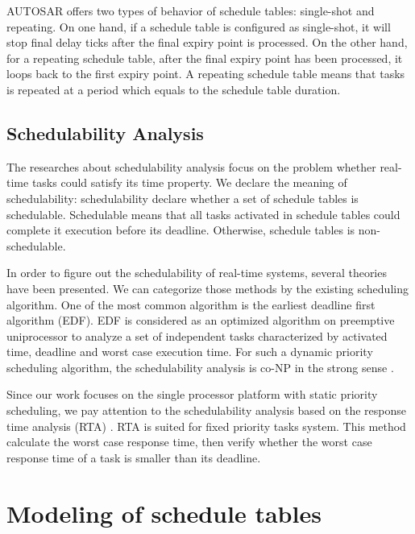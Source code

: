 \documentclass[10pt,conference]{IEEEtran}
\begin{document}
AUTOSAR offers two types of behavior of schedule tables: single-shot and repeating. On one hand, if a schedule table is configured as single-shot, it will stop final delay ticks after the final expiry point is processed. On the other hand, for a repeating schedule table, after the final expiry point has been processed, it loops back to the first expiry point. A repeating schedule table means that tasks is repeated at a period which equals to the schedule table duration.

\subsection{Schedulability Analysis}
The researches about schedulability analysis focus on the problem whether real-time tasks could satisfy its time property. We declare the meaning of schedulability: schedulability declare whether a set of schedule tables is schedulable. Schedulable means that all tasks activated in schedule tables could complete it execution before its deadline. Otherwise, schedule tables is non-schedulable.

In order to figure out the schedulability of real-time systems, several theories have been presented. We can categorize those methods by the existing scheduling algorithm. One of the most common algorithm is the earliest deadline first algorithm (EDF). EDF is considered as an optimized algorithm on preemptive uniprocessor to analyze a set of independent tasks characterized by activated time, deadline and worst case execution time. For such a dynamic priority scheduling algorithm, the schedulability analysis is co-NP in the strong sense \cite{Goossens:1999:LWC:553897}.

Since our work focuses on the single processor platform with static priority scheduling, we pay attention to the schedulability analysis based on the response time analysis (RTA) \cite{DBLP:journals/iee/AudsleyBRTW93}. RTA is suited for fixed priority tasks system. This method calculate the worst case response time, then verify whether the worst case response time of a task is smaller than its deadline. 

\section{Modeling of schedule tables}
\end{document}
